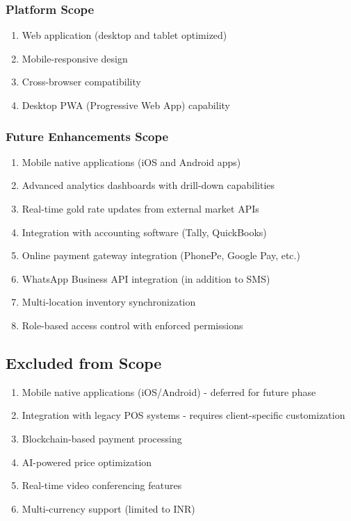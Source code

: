 \documentclass[12pt,a4paper]{report}
\begin{document}
\subsubsection{Platform Scope}
\begin{enumerate}[label=\roman*)]
    \item Web application (desktop and tablet optimized)
    \item Mobile-responsive design
    \item Cross-browser compatibility
    \item Desktop PWA (Progressive Web App) capability
\end{enumerate}

\subsubsection{Future Enhancements Scope}
\begin{enumerate}[label=\roman*)]
    \item Mobile native applications (iOS and Android apps)
    \item Advanced analytics dashboards with drill-down capabilities
    \item Real-time gold rate updates from external market APIs
    \item Integration with accounting software (Tally, QuickBooks)
    \item Online payment gateway integration (PhonePe, Google Pay, etc.)
    \item WhatsApp Business API integration (in addition to SMS)
    \item Multi-location inventory synchronization
    \item Role-based access control with enforced permissions
\end{enumerate}

\subsection{Excluded from Scope}

\begin{enumerate}[label=\roman*)]
    \item Mobile native applications (iOS/Android) - deferred for future phase
    \item Integration with legacy POS systems - requires client-specific customization
    \item Blockchain-based payment processing
    \item AI-powered price optimization
    \item Real-time video conferencing features
    \item Multi-currency support (limited to INR)
\end{enumerate}
\end{document}
